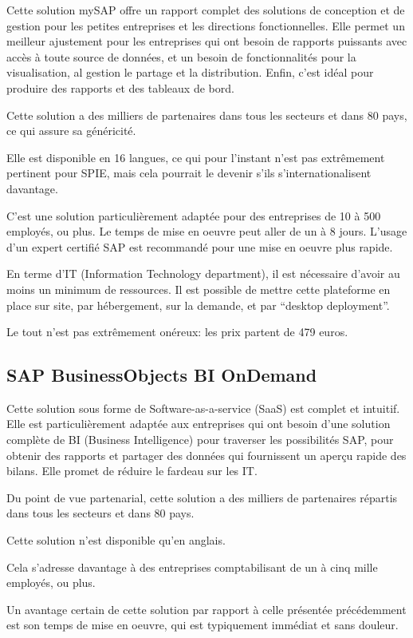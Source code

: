 Cette solution mySAP offre un rapport complet des solutions de conception et de gestion pour les petites entreprises et les directions fonctionnelles. Elle permet un meilleur ajustement pour les entreprises qui ont besoin de rapports puissants avec accès à toute source de données, et un besoin de fonctionnalités pour la visualisation, al gestion le partage et la distribution. Enfin, c’est idéal pour produire des rapports et des tableaux de bord.

Cette solution a des milliers de partenaires dans tous les secteurs et dans 80 pays, ce qui assure sa généricité.

Elle est disponible en 16 langues, ce qui pour l’instant n’est pas extrêmement pertinent pour SPIE, mais cela pourrait le devenir s’ils s’internationalisent davantage.

C’est une solution particulièrement adaptée pour des entreprises de 10 à 500 employés, ou plus.
Le temps de mise en oeuvre peut aller de un à 8 jours. L’usage d’un expert certifié SAP est recommandé pour une mise en oeuvre plus rapide.

En terme d’IT (Information Technology department), il est nécessaire d’avoir au moins un minimum de ressources. Il est possible de mettre cette plateforme en place sur site, par hébergement, sur la demande, et par “desktop deployment”.

Le tout n’est pas extrêmement onéreux: les prix partent de 479 euros.

\subsection{SAP BusinessObjects BI OnDemand}

Cette solution sous forme de Software-as-a-service (SaaS) est complet et intuitif. Elle est particulièrement adaptée aux entreprises qui ont besoin d’une solution complète de BI (Business Intelligence) pour traverser les possibilités SAP, pour obtenir des rapports et partager des données qui fournissent un aperçu rapide des bilans. Elle promet de réduire le fardeau sur les IT.

Du point de vue partenarial, cette solution a des milliers de partenaires répartis dans tous les secteurs et dans 80 pays.

Cette solution n’est disponible qu’en anglais.

Cela s’adresse davantage à des entreprises comptabilisant de un à cinq mille employés, ou plus.

Un avantage certain de cette solution par rapport à celle présentée précédemment est son temps de mise en oeuvre, qui est typiquement immédiat et sans douleur.

